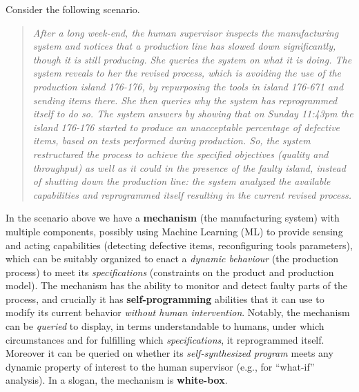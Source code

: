 Consider the following scenario.
\begin{quote}\it
  After a long week-end, the human supervisor inspects the
  manufacturing system and notices that a production line has
   slowed down significantly, though it is still producing.
  She queries the system on what it is doing.  The system reveals to her  the
  revised process, which is avoiding the use of the production island
  176-176, by repurposing the tools in island 176-671 and sending
  items there.
  She then queries why the system has reprogrammed itself to do so.
  The system answers by showing that on Sunday 11:43pm the island
  176-176 started to produce an unacceptable percentage of defective
  items, based on tests performed during production. 
  So, the system restructured the process to achieve the specified
  objectives (quality and throughput) as well as it could in the presence
  of the faulty island, instead of shutting down the production line:
  the  system analyzed  the  available  capabilities and  reprogrammed
  itself resulting in the current revised process.


\end{quote}

\noindent
In the scenario above we have a \textbf{mechanism} (the manufacturing
system) with multiple components,  possibly using Machine Learning (ML) to provide sensing and acting capabilities (detecting defective items, reconfiguring tools parameters), which can be suitably organized  to enact a \emph{dynamic behaviour} (the
production process)
to meet its \emph{specifications} (constraints on the product and production model).
The mechanism has the ability to monitor and detect faulty parts of the process, and crucially it has  \textbf{self-programming}  abilities that it can use to modify its 
current behavior %
\emph{without human intervention}.  
Notably, the mechanism can be \emph{queried} to display, in terms
understandable to humans, under which circumstances and for fulfilling which \emph{specifications}, it reprogrammed itself. Moreover it can be queried on whether  its \emph{self-synthesized program} meets any dynamic property of interest to the human supervisor (e.g., for ``what-if'' analysis).
In a slogan, the
mechanism is \textbf{white-box}.

